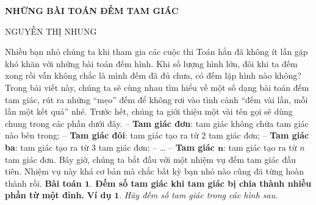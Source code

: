 \newpage
{}
\everymath{\color{toancuabi}}
\graphicspath{{../timhieucungbi/demtamgiac1/}}
	\begin{center}
		\textbf{\Large\color{toancuabi}NHỮNG BÀI TOÁN ĐẾM TAM GIÁC}
		
		\vspace*{5pt}
		NGUYỄN THỊ NHUNG
	\end{center}

	Nhiều bạn nhỏ chúng ta khi tham gia các cuộc thi Toán hẳn đã không ít lần gặp khó khăn với những bài toán đếm hình. Khi số lượng hình lớn, đôi khi ta đếm xong rồi vẫn không chắc là mình đếm đã đủ chưa, có đếm lặp hình nào không? Trong bài viết này, chúng ta sẽ cùng nhau tìm hiểu về một số dạng bài toán đếm tam giác, rút ra những “mẹo” đếm để không rơi vào tình cảnh “đếm vài lần, mỗi lần một kết quả” nhé.
	\vskip 0.1cm
	Trước hết, chúng ta giới thiệu một vài tên gọi sẽ dùng chung trong các phần dưới đây.
	\vskip 0.1cm
	-- \textbf{\color{toancuabi}Tam giác đơn}: tam giác không chứa tam giác nào bên trong;
	\vskip 0.1cm
	-- \textbf{\color{toancuabi}Tam giác đôi}: tam giác tạo ra từ $2$ tam giác đơn;
	\vskip 0.1cm
	-- \textbf{\color{toancuabi}Tam giác ba}: tam giác tạo ra  từ $3$ tam giác đơn;
	\vskip 0.1cm
	-- \ldots
	\vskip 0.1cm
	-- \textbf{\color{toancuabi}Tam giác $\pmb{n}$}: tam giác tạo ra từ $n$ tam giác đơn.
	\vskip 0.1cm
	Bây giờ, chúng ta bắt đầu với một nhiệm vụ đếm tam giác đầu tiên. Nhiệm vụ này khá cơ bản mà chắc bất kỳ bạn nhỏ nào cũng đã từng hoàn thành rồi.
	\vskip 0.1cm
	\textbf{\color{toancuabi}Bài toán $\pmb{1.}$ Đếm số tam giác khi tam giác bị chia thành nhiều phần từ một đỉnh.}
	\vskip 0.1cm
	\textbf{\color{toancuabi}Ví dụ} $\pmb{1.}$ \textit{Hãy đếm số tam giác trong các hình sau.}
